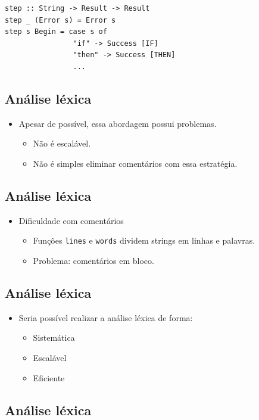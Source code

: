 \documentclass[11pt]{article}
\begin{document}
\begin{verbatim}
step :: String -> Result -> Result
step _ (Error s) = Error s
step s Begin = case s of
                "if" -> Success [IF]
                "then" -> Success [THEN]
                ...
\end{verbatim}
\subsection*{Análise léxica}
\label{sec:org2fb8f6e}

\begin{itemize}
\item Apesar de possível, essa abordagem possui problemas.
\begin{itemize}
\item Não é escalável.
\item Não é simples eliminar comentários com essa estratégia.
\end{itemize}
\end{itemize}
\subsection*{Análise léxica}
\label{sec:org637f813}

\begin{itemize}
\item Dificuldade com comentários
\begin{itemize}
\item Funções \texttt{lines} e \texttt{words} dividem strings em linhas e palavras.
\item Problema: comentários em bloco.
\end{itemize}
\end{itemize}
\subsection*{Análise léxica}
\label{sec:org866e5ca}

\begin{itemize}
\item Seria possível realizar a análise léxica de forma:
\begin{itemize}
\item Sistemática
\item Escalável
\item Eficiente
\end{itemize}
\end{itemize}
\subsection*{Análise léxica}
\label{sec:org4b177da}
\end{document}
